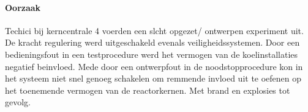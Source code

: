 \documentclass{article}
\begin{document}
	\paragraph{Oorzaak}
	\newline \indent
	
	Techici bij kerncentrale 4 voerden een slcht opgezet/ ontwerpen experiment uit. De  kracht regulering werd uitgeschakeld evenals veiligheidssystemen. 
	Door een bedieningsfout in een testprocedure werd het vermogen van de koelinstallaties negatief beinvloed. Mede door een ontwerpfout in de noodstopprocedure kon in het systeem niet snel genoeg schakelen om remmende invloed uit te oefenen op het toenemende vermogen van de reactorkernen. Met brand en explosies tot gevolg.
	\cite{rivmTjernobyl}
	\cite{andereTijdenTjernobyl}
	\cite{kingskey19042022tjernobyl}
	\cite{erikbork26042023reactor4}
	\cite{nosTjernobyl30jaarlater}
\end{document}
